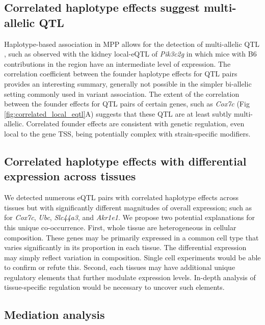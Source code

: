 \documentclass[10pt,letterpaper]{article}
\begin{document}
\subsection*{Correlated haplotype effects suggest multi-allelic QTL}
Haplotype-based association in MPP allows for the detection of multi-allelic QTL \cite{Crowley2015}, such as observed with the kidney local-eQTL of \textit{Pik3c2g} in which mice with B6 contributions in the region have an intermediate level of expression. The correlation coefficient between the founder haplotype effects for QTL pairs provides an interesting summary, generally not possible in the simpler bi-allelic setting commonly used in variant association. The extent of the correlation between the founder effects for QTL pairs of certain genes, such as \textit{Cox7c} (Fig \ref{fig:correlated_local_eqtl}A) suggests that these QTL are at least subtly multi-allelic. Correlated founder effects are consistent with genetic regulation, even local to the gene TSS, being potentially complex with strain-specific modifiers.

\subsection*{Correlated haplotype effects with differential expression across tissues}

We detected numerous eQTL pairs with correlated haplotype effects across tissues but with significantly different magnitudes of overall expression; such as for \textit{Cox7c}, \textit{Ubc}, \textit{Slc44a3}, and \textit{Akr1e1}. We propose two potential explanations for this unique co-occurrence. 
First, whole tissue are heterogeneous in cellular composition. These genes may be primarily expressed in a common cell type that varies significantly in its proportion in each tissue. The differential expression may simply reflect variation in composition. Single cell experiments would be able to confirm or refute this. 
Second, each tissues may have additional unique regulatory elements that further modulate expression levels. In-depth analysis of tissue-specific regulation would be necessary to uncover such elements. 

\subsection*{Mediation analysis}
\end{document}
